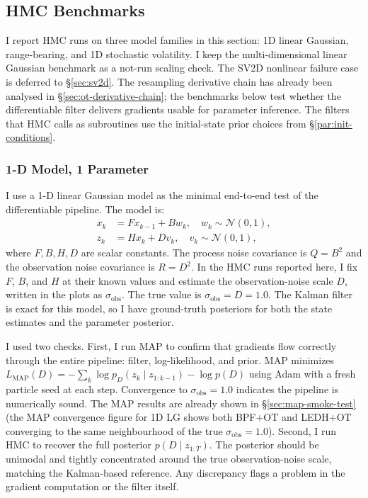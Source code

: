 \documentclass{article}
\begin{document}
\iffalse
\subsection{HMC Benchmarks}
\label{sec:linear-gaussian-benchmark}

I report HMC runs on three model families in this section: 1D linear Gaussian, range-bearing, and 1D stochastic volatility. I keep the multi-dimensional linear Gaussian benchmark as a not-run scaling check. The SV2D nonlinear failure case is deferred to \S\ref{sec:sv2d}. The resampling derivative chain has already been analysed in \S\ref{sec:ot-derivative-chain}; the benchmarks below test whether the differentiable filter delivers gradients usable for parameter inference. The filters that HMC calls as subroutines use the initial-state prior choices from \S\ref{par:init-conditions}.

\subsubsection{1-D Model, 1 Parameter}
\label{sec:lg-hmc-1d}

I use a 1-D linear Gaussian model as the minimal end-to-end test of the differentiable pipeline. The model is:
\begin{equation}
\begin{split}
x_k &= F x_{k-1} + B w_k, \quad w_k \sim \mathcal{N}(0, 1), \\
z_k &= H x_k + D v_k, \quad v_k \sim \mathcal{N}(0, 1),
\end{split}
\end{equation}
where $F, B, H, D$ are scalar constants. The process noise covariance is $Q = B^2$ and the observation noise covariance is $R = D^2$. In the HMC runs reported here, I fix $F$, $B$, and $H$ at their known values and estimate the observation-noise scale $D$, written in the plots as $\sigma_{\text{obs}}$. The true value is $\sigma_{\text{obs}} = D = 1.0$. The Kalman filter is exact for this model, so I have ground-truth posteriors for both the state estimates and the parameter posterior.

I used two checks. First, I run MAP to confirm that gradients flow correctly through the entire pipeline: filter, log-likelihood, and prior. MAP minimizes $L_{\mathrm{MAP}}(D) = -\sum_k \log p_D(z_k \mid z_{1:k-1}) - \log p(D)$ using Adam with a fresh particle seed at each step. Convergence to $\sigma_{\text{obs}} = 1.0$ indicates the pipeline is numerically sound. The MAP results are already shown in \S\ref{sec:map-smoke-test} (the MAP convergence figure for 1D LG shows both BPF+OT and LEDH+OT converging to the same neighbourhood of the true $\sigma_{\text{obs}} = 1.0$). Second, I run HMC to recover the full posterior $p(D \mid z_{1:T})$. The posterior should be unimodal and tightly concentrated around the true observation-noise scale, matching the Kalman-based reference. Any discrepancy flags a problem in the gradient computation or the filter itself.
\end{document}

